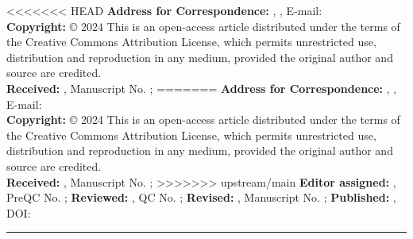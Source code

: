 \documentclass{article} %
\begin{document}
\begin{justify} %
\fontsize{8.5}{10.2}\selectfont

<<<<<<< HEAD
\color{color_100238}\textbf{Address for Correspondence:}  
\color{color_29791}, ,
E-mail: \href{mailto:\VAR{email}}{} \\

\color{color_100238}\textbf{Copyright:} 
\color{color_29791}© 2024  This is an open-access article distributed under the terms of the Creative Commons Attribution License, which permits unrestricted use, distribution and reproduction in any medium, provided the original author and source are credited. \\

\vspace{0.1cm}
\color{color_29791}\textbf{Received:} , Manuscript No. ; 
=======
\color{Light_navy_blue}\textbf{Address for Correspondence:}  
\color{Black}, ,
E-mail: \href{mailto:\VAR{email}}{} \\

\color{Light_navy_blue}\textbf{Copyright:} 
\color{Black}© 2024  This is an open-access article distributed under the terms of the Creative Commons Attribution License, which permits unrestricted use, distribution and reproduction in any medium, provided the original author and source are credited. \\

\vspace{0.1cm}
\color{Black}\textbf{Received:} , Manuscript No. ; 
>>>>>>> upstream/main
\textbf{Editor assigned:} , PreQC No. ; 
\textbf{Reviewed:} , QC No. ; 
\textbf{Revised:} , Manuscript No. ; 
\textbf{Published:} , 
DOI: \href{\VAR{parentLink}}{}

\noindent\color{Light_navy_blue}\rule{\linewidth}{1pt}

\end{justify}

\label{TotPages}
\end{document}
